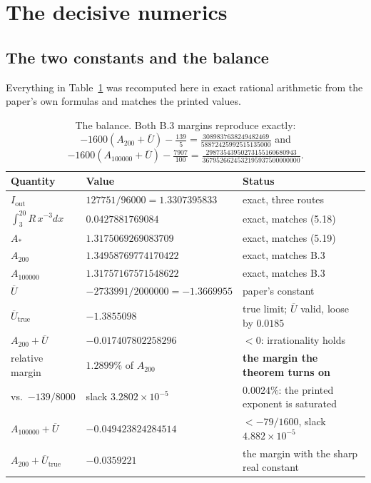 \documentclass[11pt]{article}
\theoremstyle{definition}
\newcommand{\Ub}{\overline{U}}
\newcommand{\Iout}{I_{\mathrm{out}}}
\begin{document}
\section{The decisive numerics}\label{sec:numerics}

\subsection{The two constants and the balance}

Everything in Table~\ref{tab:balance} was recomputed here in exact rational arithmetic from the
paper's own formulas and matches the printed values.

\begin{table}[htbp]
\centering
\small
\begin{tabular}{@{}lll@{}}
\toprule
Quantity & Value & Status \\
\midrule
$\Iout$ & $127751/96000=1.3307395833$ & exact, three routes \\
$\int_3^{20}R\,x^{-3}dx$ & $0.0427881769084$ & exact, matches (5.18) \\
$A_*$ & $1.3175069269083709$ & exact, matches (5.19) \\
$A_{200}$ & $1.34958769774170422$ & exact, matches B.3 \\
$A_{100000}$ & $1.31757167571548622$ & exact, matches B.3 \\
$\Ub$ & $-2733991/2000000=-1.3669955$ & paper's constant \\
$\Ub_{\mathrm{true}}$ & $-1.3855098$ & true limit; $\Ub$ valid, loose by $0.0185$ \\
\midrule
$A_{200}+\Ub$ & $-0.017407802258296$ & $<0$: irrationality holds \\
relative margin & $1.2899\%$ of $A_{200}$ & \textbf{the margin the theorem turns on} \\
vs.\ $-139/8000$ & slack $3.2802\times10^{-5}$ & $0.0024\%$: the printed exponent is saturated \\
$A_{100000}+\Ub$ & $-0.049423824284514$ & $<-79/1600$, slack $4.882\times10^{-5}$ \\
$A_{200}+\Ub_{\mathrm{true}}$ & $-0.0359221$ & the margin with the sharp real constant \\
\bottomrule
\end{tabular}
\caption{The balance. Both B.3 margins reproduce exactly:
{\footnotesize$-1600(A_{200}+\Ub)-\tfrac{139}{5}=\tfrac{3089837638249482469}{58872425992515135000}$}
and {\footnotesize$-1600(A_{100000}+\Ub)-\tfrac{7907}{100}
=\tfrac{29873543950273155160680943}{3679526624532195937500000000}$}.}
\label{tab:balance}
\end{table}
\end{document}
